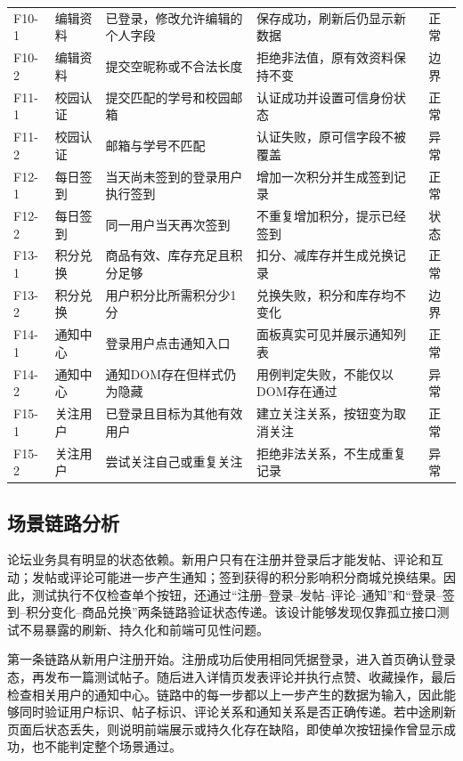 \documentclass[bwprint]{report}
\begin{document}
\begin{longtable}{P{1.2cm}P{2.4cm}P{4.2cm}P{4.4cm}P{1.4cm}}
F10-1 & 编辑资料 & 已登录，修改允许编辑的个人字段 & 保存成功，刷新后仍显示新数据 & 正常 \\
F10-2 & 编辑资料 & 提交空昵称或不合法长度 & 拒绝非法值，原有效资料保持不变 & 边界 \\
F11-1 & 校园认证 & 提交匹配的学号和校园邮箱 & 认证成功并设置可信身份状态 & 正常 \\
F11-2 & 校园认证 & 邮箱与学号不匹配 & 认证失败，原可信字段不被覆盖 & 异常 \\
F12-1 & 每日签到 & 当天尚未签到的登录用户执行签到 & 增加一次积分并生成签到记录 & 正常 \\
F12-2 & 每日签到 & 同一用户当天再次签到 & 不重复增加积分，提示已经签到 & 状态 \\
F13-1 & 积分兑换 & 商品有效、库存充足且积分足够 & 扣分、减库存并生成兑换记录 & 正常 \\
F13-2 & 积分兑换 & 用户积分比所需积分少1分 & 兑换失败，积分和库存均不变化 & 边界 \\
F14-1 & 通知中心 & 登录用户点击通知入口 & 面板真实可见并展示通知列表 & 正常 \\
F14-2 & 通知中心 & 通知DOM存在但样式仍为隐藏 & 用例判定失败，不能仅以DOM存在通过 & 异常 \\
F15-1 & 关注用户 & 已登录且目标为其他有效用户 & 建立关注关系，按钮变为取消关注 & 正常 \\
F15-2 & 关注用户 & 尝试关注自己或重复关注 & 拒绝非法关系，不生成重复记录 & 异常 \\
\bottomrule
\end{longtable}

\subsection{场景链路分析}
论坛业务具有明显的状态依赖。新用户只有在注册并登录后才能发帖、评论和互动；发帖或评论可能进一步产生通知；签到获得的积分影响积分商城兑换结果。因此，测试执行不仅检查单个按钮，还通过“注册--登录--发帖--评论--通知”和“登录--签到--积分变化--商品兑换”两条链路验证状态传递。该设计能够发现仅靠孤立接口测试不易暴露的刷新、持久化和前端可见性问题。

第一条链路从新用户注册开始。注册成功后使用相同凭据登录，进入首页确认登录态，再发布一篇测试帖子。随后进入详情页发表评论并执行点赞、收藏操作，最后检查相关用户的通知中心。链路中的每一步都以上一步产生的数据为输入，因此能够同时验证用户标识、帖子标识、评论关系和通知关系是否正确传递。若中途刷新页面后状态丢失，则说明前端展示或持久化存在缺陷，即使单次按钮操作曾显示成功，也不能判定整个场景通过。
\end{document}
